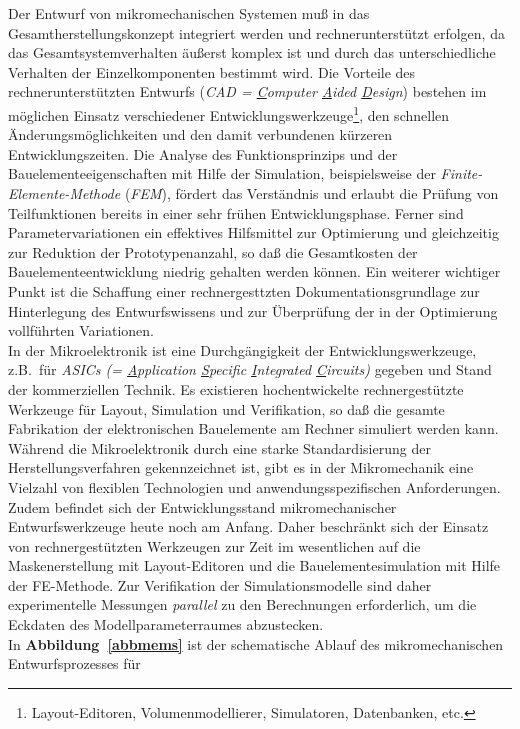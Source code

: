 Der Entwurf von mikromechanischen Systemen muß in das
Gesamtherstellungskonzept integriert werden und rechnerunterstützt
erfolgen, da das Gesamtsystemverhalten äußerst komplex ist und durch das
unterschiedliche Verhalten der Einzelkomponenten bestimmt wird. Die
Vorteile des rechnerunterstützten Entwurfs ({\em CAD = \underline{C}omputer
\underline{A}ided \underline{D}esign}) bestehen im möglichen Einsatz
verschiedener Entwicklungswerkzeuge\footnote{Layout-Editoren,
Volumenmodellierer, Simulatoren, Datenbanken, etc.},
den schnellen Änderungsmöglichkeiten
und den damit verbundenen kürzeren Entwicklungszeiten. Die Analyse des
Funktionsprinzips und der Bauelementeeigenschaften mit Hilfe der Simulation,
beispielsweise der {\em Finite-Elemente-Methode} ({\em FEM}), fördert das
Verständnis und erlaubt die Prüfung von Teilfunktionen bereits
in einer sehr frühen Entwicklungsphase. Ferner sind Parametervariationen
ein effektives Hilfsmittel zur Optimierung und gleichzeitig zur
Reduktion der Proto\-typenanzahl, so daß die Gesamtkosten der
Bauelementeentwicklung niedrig gehalten werden können. Ein weiterer
wichtiger Punkt ist die Schaffung einer rechnergesttzten
Dokumentationsgrundlage zur Hinterlegung des Entwurfswissens und zur
Überprüfung der in der Optimierung vollführten Variationen.\\
In der Mikroelektronik ist eine
Durchgängigkeit der Entwicklungswerkzeuge, z.B.\ für {\em ASICs (=
\underline{A}pplication \underline{S}pecific \underline{I}ntegrated
\underline{C}ircuits)} gegeben und Stand der kommerziellen
Technik.  Es existieren hochentwickelte rechnergestützte Werkzeuge für
Layout, Simulation und Verifikation, so daß die gesamte Fabrikation der
elektronischen Bauelemente am Rechner simuliert werden kann. Während
die Mikroelektronik durch eine starke Standardisierung der
Herstellungsverfahren gekennzeichnet ist, gibt es in der Mikromechanik
eine Vielzahl von flexiblen Technologien und anwendungsspezifischen
Anforderungen. Zudem befindet sich der Entwicklungsstand mikromechanischer
Entwurfswerkzeuge heute noch am Anfang. Daher beschränkt sich der
Einsatz von rechnergestützten Werkzeugen zur Zeit im
wesentlichen auf die Maskenerstellung mit Layout-Editoren und die
Bauelemente\-simulation mit Hilfe der FE-Methode. Zur Verifikation der
Simulationsmodelle sind daher experimentelle Messungen {\em parallel}
zu den Berechnungen erforderlich, um die Eckdaten des Modellparameterraumes
abzustecken.\\
%
In {\bf Abbildung~\ref{abbmems}} ist der schematische Ablauf des
mikromechanischen Entwurfsprozesses für

